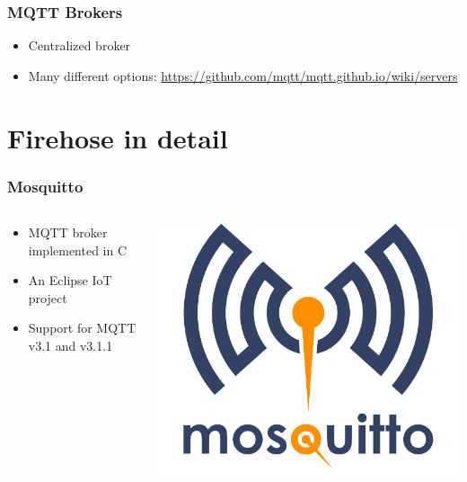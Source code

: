 \documentclass[aspectratio=169,11pt,hyperref={colorlinks=true}]{beamer}
\begin{document}
\begin{frame}
    \frametitle{MQTT Brokers}
    \begin{itemize}
        \item Centralized broker
        \item Many different options: \href{https://github.com/mqtt/mqtt.github.io/wiki/servers}{https://github.com/mqtt/mqtt.github.io/wiki/servers}
     \end{itemize}
\end{frame}

\section{Firehose in detail}

\begin{frame}
    \frametitle{Mosquitto}
    \begin{columns}[T]
        \begin{column}{.48\textwidth}
            \begin{itemize}
                \item MQTT broker implemented in C
                \item An Eclipse IoT project
                \item Support for MQTT v3.1 and v3.1.1
            \end{itemize}
        \end{column}
        \begin{column}{.48\textwidth}
            \includegraphics[width=\textwidth]{mosquitto.png}
        \end{column}
    \end{columns}
\end{frame}
\end{document}
